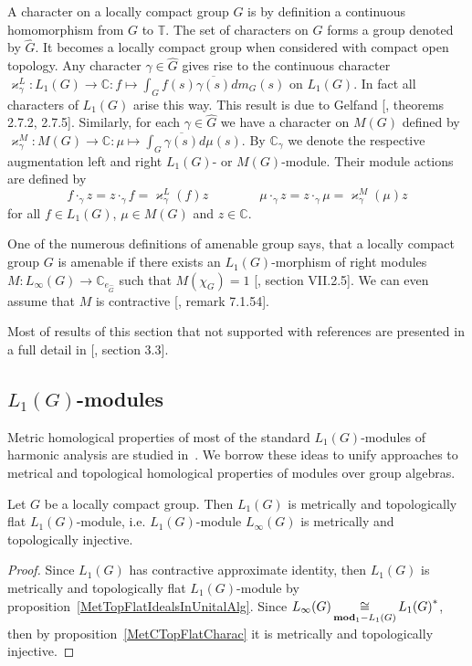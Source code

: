 A character on a locally compact group $G$ is by definition a continuous 
homomorphism from $G$ to $\mathbb{T}$. The set of characters on $G$ forms a 
group denoted by $\widehat{G}$. It becomes a locally compact group when 
considered with compact open topology. Any character $\gamma\in\widehat{G}$ 
gives rise to the continuous character 
$\varkappa_\gamma^L
:L_1(G)\to\mathbb{C}
:f\mapsto \int_G f(s)\overline{\gamma(s)}dm_G(s)$ on $L_1(G)$. In fact all 
characters of $L_1(G)$ arise this way. This result is due to 
Gelfand [\cite{KaniBanAlg}, theorems 2.7.2, 2.7.5]. Similarly, for 
each $\gamma\in\widehat{G}$ we have a character on $M(G)$ defined by 
$\varkappa_\gamma^M
:M(G)\to\mathbb{C}
:\mu\mapsto\int_{G} \overline{\gamma(s)}d\mu(s)$. By $\mathbb{C}_\gamma$ we 
denote the respective augmentation left and right $L_1(G)$- or $M(G)$-module. 
Their module actions are defined by
$$
f\cdot_{\gamma}z=z\cdot_{\gamma}f=\varkappa_\gamma^L(f)z \qquad\qquad
\mu\cdot_{\gamma}z=z\cdot_{\gamma}\mu=\varkappa_\gamma^M(\mu)z
$$
for all $f\in L_1(G)$, $\mu\in M(G)$ and $z\in\mathbb{C}$. 

One of the numerous definitions of amenable group says, that a locally compact 
group $G$ is amenable if there exists an $L_1(G)$-morphism of right 
modules $M:L_\infty(G)\to\mathbb{C}_{e_{\widehat{G}}}$ such 
that $M(\chi_G)=1$ [\cite{HelBanLocConvAlg}, section VII.2.5]. We can even 
assume that $M$ is contractive [\cite{HelBanLocConvAlg}, remark 7.1.54].

Most of results of this section that not supported with references are 
presented in a full detail in [\cite{DalBanAlgAutCont}, section 3.3].


\subsection{
    \texorpdfstring{$L_1(G)$}{L1(G)}-modules
}\label{SubSectionL1GModules}

Metric homological properties of most of the standard $L_1(G)$-modules of 
harmonic analysis are studied in~\cite{GravInjProjBanMod}. We borrow these 
ideas to unify approaches to metrical and topological homological properties 
of modules over group algebras.

\begin{proposition}\label{LInfIsL1MetrInj} Let $G$ be a locally compact group. 
Then $L_1(G)$ is metrically and topologically flat $L_1(G)$-module, 
i.e. $L_1(G)$-module $L_\infty(G)$ is metrically and topologically injective.
\end{proposition} 
\begin{proof} Since $L_1(G)$ has contractive approximate identity, 
then $L_1(G)$ is metrically and topologically flat $L_1(G)$-module 
by proposition~\ref{MetTopFlatIdealsInUnitalAlg}. 
Since $L_\infty(G)\mathop{\mathbin{\cong}}\limits_{\mathbf{mod}_1-L_1(G)}{L_1(G)}^*$, then by 
proposition~\ref{MetCTopFlatCharac} it is metrically and topologically injective.
\end{proof}

